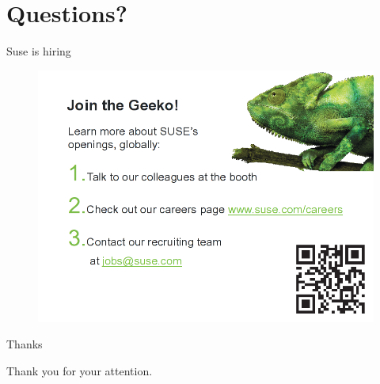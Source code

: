 \documentclass{beamer}
\begin{document}
\section{Questions?}

\begin{frame}{Suse is hiring}
  \begin{figure}
    \includegraphics[width= 0.8\linewidth]{suse_hiring.png}
  \end{figure}
\end{frame}

\begin{frame}{Thanks}
  \begin{center}
    Thank you for your attention.
  \end{center}
\end{frame}
\end{document}
